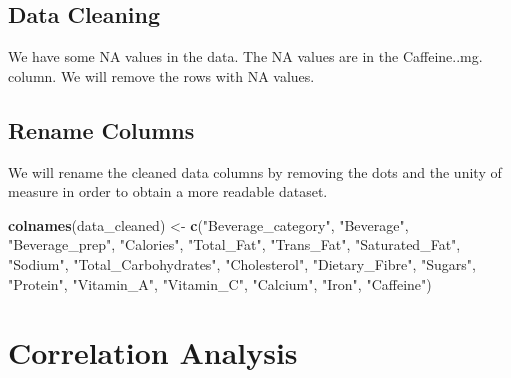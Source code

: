 \documentclass[
]{article}
\newenvironment{Shaded}{\begin{snugshade}}{\end{snugshade}}
\newcommand{\FunctionTok}[1]{\textcolor[rgb]{0.13,0.29,0.53}{\textbf{#1}}}
\newcommand{\NormalTok}[1]{#1}
\newcommand{\OtherTok}[1]{\textcolor[rgb]{0.56,0.35,0.01}{#1}}
\newcommand{\SpecialCharTok}[1]{\textcolor[rgb]{0.81,0.36,0.00}{\textbf{#1}}}
\newcommand{\StringTok}[1]{\textcolor[rgb]{0.31,0.60,0.02}{#1}}
\begin{document}
\subsection{Data Cleaning}\label{data-cleaning}

We have some NA values in the data. The NA values are in the
Caffeine..mg. column. We will remove the rows with NA values.

\begin{Shaded}
\end{Shaded}

\subsection{Rename Columns}\label{rename-columns}

We will rename the cleaned data columns by removing the dots and the
unity of measure in order to obtain a more readable dataset.

\begin{Shaded}
\begin{Highlighting}[]
\FunctionTok{colnames}\NormalTok{(data\_cleaned) }\OtherTok{\textless{}{-}} \FunctionTok{c}\NormalTok{(}\StringTok{"Beverage\_category"}\NormalTok{, }\StringTok{"Beverage"}\NormalTok{,}
                            \StringTok{"Beverage\_prep"}\NormalTok{, }\StringTok{"Calories"}\NormalTok{,}
                            \StringTok{"Total\_Fat"}\NormalTok{, }\StringTok{"Trans\_Fat"}\NormalTok{,}
                            \StringTok{"Saturated\_Fat"}\NormalTok{, }\StringTok{"Sodium"}\NormalTok{,}
                            \StringTok{"Total\_Carbohydrates"}\NormalTok{, }\StringTok{"Cholesterol"}\NormalTok{,}
                            \StringTok{"Dietary\_Fibre"}\NormalTok{, }\StringTok{"Sugars"}\NormalTok{,}
                            \StringTok{"Protein"}\NormalTok{, }\StringTok{"Vitamin\_A"}\NormalTok{,}
                            \StringTok{"Vitamin\_C"}\NormalTok{, }\StringTok{"Calcium"}\NormalTok{,}
                            \StringTok{"Iron"}\NormalTok{, }\StringTok{"Caffeine"}\NormalTok{)}
\end{Highlighting}
\end{Shaded}

\section{Correlation Analysis}\label{correlation-analysis}
\end{document}
